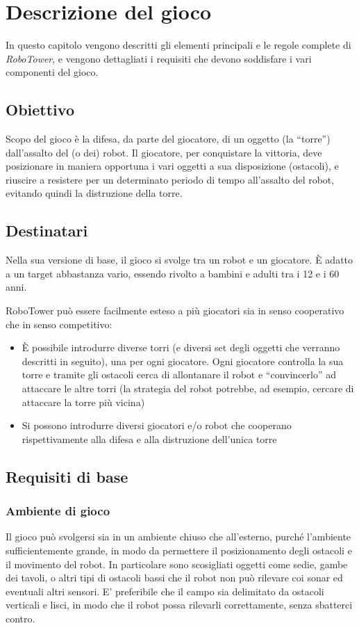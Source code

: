 \chapter{Descrizione del gioco}
\label{cap:descrizione}

In questo capitolo vengono descritti gli elementi principali e le regole complete di \emph{RoboTower}, e vengono dettagliati i requisiti che devono soddisfare i vari componenti del gioco.

\section{Obiettivo}
Scopo del gioco è la difesa, da parte del giocatore, di un oggetto (la ``torre'') dall'assalto del (o dei) robot. 
Il giocatore, per conquistare la vittoria, deve posizionare in maniera opportuna i vari oggetti a sua disposizione (ostacoli), e riuscire a resistere per un determinato periodo di tempo all'assalto del robot, evitando quindi la distruzione della torre.

\section{Destinatari}
Nella sua versione di base, il gioco si svolge tra un robot e un giocatore. È adatto a un target abbastanza vario, essendo rivolto a bambini e adulti tra i 12 e i 60 anni.

RoboTower può essere facilmente esteso a più giocatori sia in senso cooperativo che in senso competitivo:
	\begin{itemize}
		\item È possibile introdurre diverse torri (e diversi set degli oggetti che verranno descritti in seguito), una per ogni giocatore. Ogni giocatore controlla la sua torre e tramite gli ostacoli cerca di allontanare il robot e ``convincerlo'' ad attaccare le altre torri (la strategia del robot potrebbe, ad esempio, cercare di attaccare la torre più vicina)
		\item Si possono introdurre diversi giocatori e/o robot che cooperano rispettivamente alla difesa e alla distruzione dell'unica torre
	\end{itemize}

\section{Requisiti di base}

\subsection*{Ambiente di gioco}
Il gioco può svolgersi sia in un ambiente chiuso che all'esterno, purché l'ambiente sufficientemente grande, in modo da permettere il posizionamento degli ostacoli e il movimento del robot. In particolare sono scosigliati oggetti come sedie, gambe dei tavoli, o altri tipi di ostacoli bassi che il robot non può rilevare coi sonar ed eventuali altri sensori. E' preferibile che il campo sia delimitato da ostacoli verticali e lisci, in modo che il robot possa rilevarli correttamente, senza sbatterci contro.


